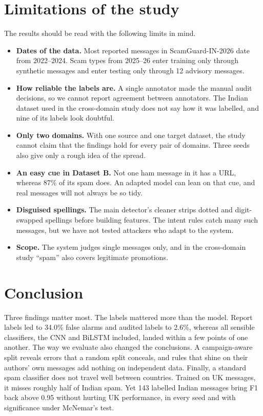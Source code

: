 \section{Limitations of the study}
The results should be read with the following limits in mind.
\begin{itemize}
\item \textbf{Dates of the data.} Most reported messages in ScamGuard-IN-2026 date from 2022--2024. Scam types from 2025--26 enter training only through synthetic messages and enter testing only through 12 advisory messages.
\item \textbf{How reliable the labels are.} A single annotator made the manual audit decisions, so we cannot report agreement between annotators. The Indian dataset used in the cross-domain study does not say how it was labelled, and nine of its labels look doubtful.
\item \textbf{Only two domains.} With one source and one target dataset, the study cannot claim that the findings hold for every pair of domains. Three seeds also give only a rough idea of the spread.
\item \textbf{An easy cue in Dataset B.} Not one ham message in it has a URL, whereas 87\% of its spam does. An adapted model can lean on that cue, and real messages will not always be so tidy.
\item \textbf{Disguised spellings.} The main detector's cleaner strips dotted and digit-swapped spellings before building features. The intent rules catch many such messages, but we have not tested attackers who adapt to the system.
\item \textbf{Scope.} The system judges single messages only, and in the cross-domain study ``spam'' also covers legitimate promotions.
\end{itemize}

\section{Conclusion}
Three findings matter most. The labels mattered more than the model. Report labels led to 34.0\% false alarms and audited labels to 2.6\%, whereas all sensible classifiers, the CNN and BiLSTM included, landed within a few points of one another. The way we evaluate also changed the conclusions. A campaign-aware split reveals errors that a random split conceals, and rules that shine on their authors' own messages add nothing on independent data. Finally, a standard spam classifier does not travel well between countries. Trained on UK messages, it misses roughly half of Indian spam. Yet 143 labelled Indian messages bring F1 back above 0.95 without hurting UK performance, in every seed and with significance under McNemar's test.
